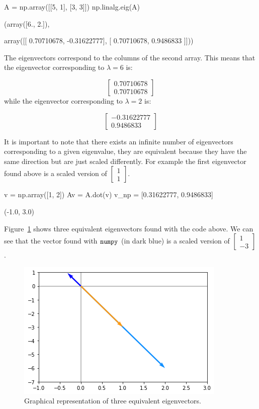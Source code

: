 \begin{ipython}
A = np.array([[5, 1], [3, 3]])
np.linalg.eig(A)
\end{ipython}
\begin{ioutput}
(array([6., 2.]),

array([[ 0.70710678, -0.31622777],
       [ 0.70710678,  0.9486833 ]]))
\end{ioutput}
The eigenvectors correspond to the columns of the second array. This means that the eigenvector corresponding to \(\lambda=6\) is:

\[\begin{bmatrix}
0.70710678 \\
0.70710678\end{bmatrix}\]
while the eigenvector corresponding to \(\lambda=2\) is:

\[\begin{bmatrix}
−0.31622777 \\
0.9486833\end{bmatrix}\]

It is important to note that there exists an infinite number of eigenvectors corresponding to a given eigenvalue, they are equivalent because they have the same direction but are just scaled differently. For example the first eigenvector found above is a scaled version of \(\begin{bmatrix}1\\ 1\end{bmatrix}\).

\begin{ipython}
v = np.array([1, 2])
Av = A.dot(v)
v_np = [0.31622777, 0.9486833]	
\end{ipython}
\begin{ioutput}
(-1.0, 3.0)
\end{ioutput}
Figure~\ref{fig:eigenvectors} shows three equivalent eigenvectors found
with the code above. We can see that the vector found with \(\tt{numpy}\) (in dark blue) is a scaled version of \(\begin{bmatrix}1\\ -3\end{bmatrix}\).

\begin{figure}[htb]
	\centering
	\includegraphics[width=0.7\linewidth]{figures/eigenvectors}
	\caption{Graphical representation of three equivalent eigenvectors.}
	\label{fig:eigenvectors}
\end{figure}

